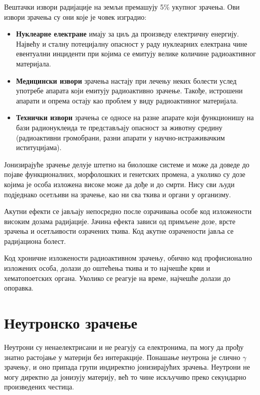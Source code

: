 \documentclass[12pt,a4paper,serbian,oneside]{book}
\begin{document}
Вештачки извори радијације на земљи премашују 5\% укупног зрачења. Ови извори зрачења су они које је човек изградио:  

\begin{itemize}

  \item \textbf{Нуклеарне електране} имају за циљ да произведу електричну енергију. Највећу и сталну потецијалну опасност у раду нуклеарних електрана чине евентуални инциденти при којима се емитују велике количине радиоактивног материјала.

  \item \textbf{Медицински извори} зрачења настају при лечењу неких болести услед употребе апарата који емитују радиоактивно зрачење. Такође, истрошени апарати и опрема остају као проблем у виду радиоактивног материјала.

  \item \textbf{Технички извори} зрачења се односе на разне апарате који функционишу на бази радионуклеида те представљају опасност за животну средину (радиоактивни громобрани, разни апарати у научно-истраживачким иституцијама).

\end{itemize}

Јонизирајуће зрачење делује штетно на биолошке системе и може да доведе до појаве функционалних, морфолошких и генетских промена, а уколико су дозе којима је особа изложена високе може да дође и до смрти. Нису сви људи подједнако осетљиви на зрачење, као ни сва ткива и органи у организму.

Акутни ефекти се јављају непосредно после озрачивања особе код изложености високим дозама радијације. Јачина ефекта зависи од примљене дозе, врсте зрачења и осетљивости озрачених ткива. Код акутне озрачености јавља се радијациона болест.

Код хроничне изложености радиоактивном зрачењу, обично код профисионално изложених особа, долази до оштећења ткива и то најчешће крви и хематопоетских органа.  Уколико  се реагује на време, најчешће долази до опоравка. 

\section{Неутронско зрачење}

Неутрони су ненаелектрисани и не реагују са електронима, па могу да прођу знатно растојање у материји без интеракције. Понашање неутрона је слично $\gamma$ зрачењу, и оно припада групи индиректно јонизирајућих зрачења. Неутрони не могу директно да јонизују материју, већ то чине искључиво преко секундарно произведених честица. 
\end{document}
